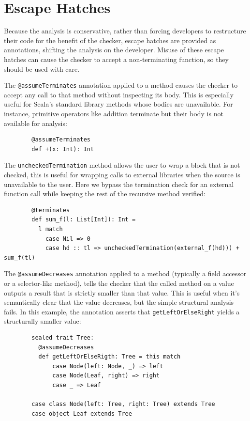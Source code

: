\section{Escape Hatches}
Because the analysis is conservative, rather than forcing developers to
restructure their code for the benefit of the checker, escape hatches are
provided as annotations, shifting the analysis on the developer. Misuse of these
escape hatches can cause the checker to accept a non-terminating function, so
they should be used with care.

The \texttt{@assumeTerminates} annotation applied to a method causes the checker
to accept any call to that method without inspecting its body. This is
especially useful for Scala's standard library methods whose bodies are
unavailable. For instance, primitive operators like addition terminate
but their body is not available for analysis:
\begin{verbatim}
        @assumeTerminates
        def +(x: Int): Int
\end{verbatim}

The \texttt{uncheckedTermination} method allows the user to wrap a block that is
not checked, this is useful for wrapping calls to external libraries when the
source is unavailable to the user. Here we bypass the termination check for an
external function call while keeping the rest of the recursive method verified:
\begin{verbatim}
        @terminates
        def sum_f(l: List[Int]): Int =
          l match
            case Nil => 0
            case hd :: tl => uncheckedTermination(external_f(hd))) + sum_f(tl)
\end{verbatim}

The \texttt{@assumeDecreases} annotation applied to a method (typically a field
accessor or a selector-like method), tells the checker that the called method on
a value outputs a result that is strictly smaller than that value.
This is useful when it's semantically clear that the value decreases, but the
simple structural analysis fails. In this example, the annotation asserts
that \texttt{getLeftOrElseRight} yields a structurally smaller value:
\newpage
\begin{verbatim}
        sealed trait Tree:
          @assumeDecreases
          def getLeftOrElseRigth: Tree = this match
              case Node(left: Node, _) => left
              case Node(Leaf, right) => right
              case _ => Leaf
              
        case class Node(left: Tree, right: Tree) extends Tree
        case object Leaf extends Tree
\end{verbatim}


